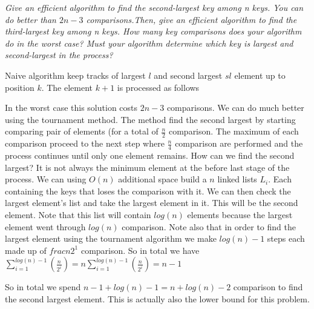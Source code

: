 \begin{problem}
\textit{Give an efficient algorithm to find the second-largest key among n keys.
You can do better than $2n-3$ comparisons.Then, give an efficient algorithm to find the third-largest key among n keys.
How many key comparisons does your algorithm do in the worst case? Must your
algorithm determine which key is largest and second-largest in the process?}

\begin{solution}
Naive algorithm keep tracks of largest $l$ and second largest $sl$ element up to position $k$. 
The element $k+1$ is processed as follows

\begin{algorithm}[H]
\end{algorithm}

In the worst case this solution costs $2n-3$ comparisons.
We can do much better using the tournament method. The method find the second largest by starting comparing pair of elements (for a total of $\frac{n}{2}$ comparison. The maximum of each comparison proceed to the next step where $\frac{n}{4}$ comparison are performed and the process continues until only one element remains. How can we find the second largest? It is not always the minimum element at the before last stage of the process. We can using $O(n)$ additional space build a $n$ linked lists $L_i$. Each containing the keys that loses the comparison with it.
We can then check the largest element's list and take the largest element in it. This will be the second element. Note that this list will contain $log(n)$ elements because the largest element went through $log(n)$ comparison. Note also that in order to find the largest element using the tournament algorithm we make $log(n)-1$ steps each made up of $frac{n}{2^1}$ comparison. So in total we have  $\sum_{i=1}^{log(n)-1} (\frac{n}{2^i}) = n \sum_{i=1}^{log(n)-1} (\frac{n}{2^i}) = n-1$


So in total we spend $n-1 + log(n) -1 = n + log(n) -2$ comparison to find the  second largest element. This is actually also the lower bound for this problem.
 
\end{solution}
\end{problem}



\begin{problem}


\begin{solution}


\end{solution}
\end{problem}


